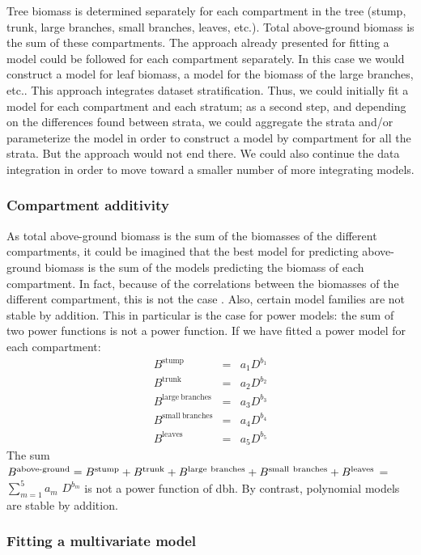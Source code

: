 Tree biomass is determined separately for each compartment in the tree (stump, trunk, large branches, small branches, leaves, etc.). Total above-ground biomass is the sum of these compartments. The approach already presented for fitting a model could be followed for each compartment separately. In this case we would construct a model for leaf biomass, a model for the biomass of the large branches, etc.. This approach integrates dataset stratification. Thus, we could initially fit a model for each compartment and each stratum; as a second step, and depending on the differences found between strata, we could aggregate the strata and/or parameterize the model in order to construct a model by compartment for all the strata. But the approach would not end there. We could also continue the data integration in order to move toward a smaller number of more integrating models.

\subsubsection{Compartment additivity}

As total above-ground biomass is the sum of the biomasses of the different compartments, it could be imagined that the best model for predicting above-ground biomass is the sum of the models predicting the biomass of each compartment. In fact, because of the correlations between the biomasses of the different compartment, this is not the case \citep{cunia84,cunia85b,parresol99}. Also, certain model families are not stable by addition. This in particular is the case for power models: the sum of two power functions is not a power function. If we have fitted a power model for each compartment:
\begin{eqnarray*}
B^{\mathrm{stump}} &=& a_1D^{b_1}
\\ B^{\mathrm{trunk}} &=& a_2D^{b_2}
\\ B^{\mathrm{large\ branches}} &=& a_3D^{b_3}
\\ B^{\mathrm{small\ branches}} &=& a_4D^{b_4}
\\ B^{\mathrm{leaves}} &=& a_5D^{b_5}
\end{eqnarray*}
The sum $B^{\mbox{\scriptsize above-ground}}=B^{\mathrm{stump}}
+B^{\mathrm{trunk}}+B^{\mathrm{large\ branches}}
+B^{\mathrm{small\ branches}}+B^{\mathrm{leaves}}$ =
$\sum_{m=1}^5a_m$ $D^{b_m}$ is not a power function of dbh. By contrast, polynomial models are stable by addition.

\subsubsection{Fitting a multivariate model}


